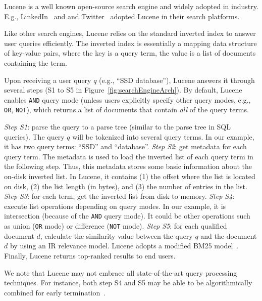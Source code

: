 Lucene is a well known open-source search engine and widely adopted in industry. E.g., LinkedIn~\cite{Hien2013} and and Twitter~\cite{Busch2012ERS} adopted Lucene in their search platforms.

Like other search engines, Lucene relies on the standard inverted index \cite{ZM06} to answer user queries efficiently. The inverted index is essentially a mapping data structure of key-value pairs, where the key is a query term, the value is a list of documents containing the term.

Upon receiving a user query $q$ (e.g., ``SSD database''), Lucene answers it through several steps (S1 to S5 in Figure~\ref{fig:searchEngineArch}).
By default, Lucene enables \texttt{AND} query mode (unless users explicitly specify other query modes, e.g., \texttt{OR}, \texttt{NOT}), which returns a list of documents that contain \emph{all} of the query terms.
 
\emph{Step S1}: parse the query to a parse tree (similar to the parse tree in SQL queries). The query $q$ will be tokenized into several query terms. In our example, it has two query terms: ``SSD'' and ``database''.
\textit{Step S2}: get metadata for each query term. The metadata is used to load the inverted list of each query term in the following step. Thus, this metadata stores some basic information about the on-disk inverted list. In Lucene, it contains (1) the offset where the list is located on disk, (2) the list length (in bytes), and (3) the number of entries in the list.
\textit{Step S3}: for each term, get the inverted list from disk to memory.
\textit{Step S4}: execute list operations depending on query modes. In our example, it is intersection (because of the \texttt{AND} query mode). It could be other operations such as union (\texttt{OR} mode) or difference (\texttt{NOT} mode).
\textit{Step S5}: for each qualified document $d$, calculate the similarity value between the query $q$ and the document $d$ by using an IR relevance model. Lucene adopts a modified BM25 model~\cite{Robertson1994}. Finally, Lucene returns top-ranked results to end users.

We note that Lucene may not embrace all state-of-the-art query processing techniques. For instance, both step S4 and S5 may be able to be algorithmically combined for early termination~\cite{Broder2003EQE,Fagin2001}.

